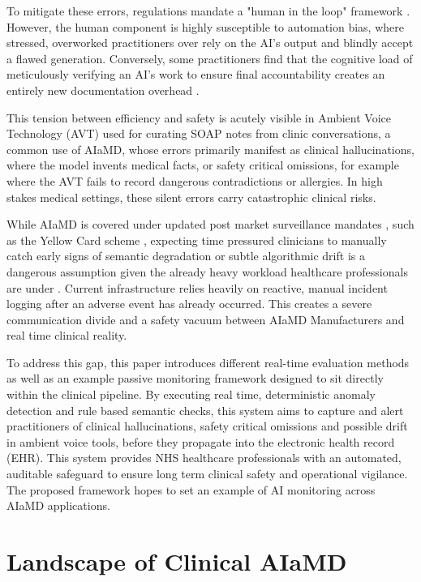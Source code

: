 \documentclass[11pt,a4paper]{article}
\begin{document}
To mitigate these errors, regulations mandate a "human in
the loop" framework \cite{mhra2021} . However, the human component is highly
susceptible to automation bias, where stressed, overworked practitioners over rely
on the AI’s output and blindly accept a flawed generation. Conversely, some
practitioners find that the cognitive load of meticulously verifying an AI’s
work to ensure final accountability creates an entirely new documentation
overhead \cite{oUKelmoun2025} \cite{aithal2026} . 

This tension between efficiency and safety is acutely visible in Ambient Voice Technology (AVT) used for curating SOAP notes from clinic conversations, a common use of AIaMD, whose errors primarily manifest as clinical hallucinations,
where the model invents medical facts, or safety critical omissions, for example where the AVT
fails to record dangerous contradictions or allergies. In high stakes
medical settings, these silent errors carry catastrophic clinical risks. 

While AIaMD is covered under updated post market
surveillance mandates ,  such as the Yellow
Card scheme , expecting time pressured clinicians to manually catch early signs
of semantic degradation or subtle algorithmic drift is a dangerous assumption given the already heavy workload healthcare professionals are under
\cite{vanoyen2026} . Current infrastructure relies heavily on reactive, manual incident
logging after an adverse event has already occurred. This creates a severe
communication divide and a safety vacuum between AIaMD Manufacturers and real time
clinical reality. 

To address this gap, this paper introduces different real-time evaluation methods as well as an example passive monitoring framework
designed to sit directly within the clinical pipeline. By executing real time,
deterministic anomaly detection and rule based semantic checks, this system
aims to capture and alert practitioners of clinical hallucinations,  safety critical omissions and possible drift
in ambient voice tools, before they propagate into the electronic health record
(EHR). This system provides NHS healthcare professionals with an automated,
auditable safeguard to ensure long term clinical safety and operational
vigilance. The proposed framework hopes to set an example of AI monitoring across AIaMD applications.
\section{Landscape of Clinical AIaMD}
\label{sec:Landscape of Clinical AIaMD}
\end{document}
